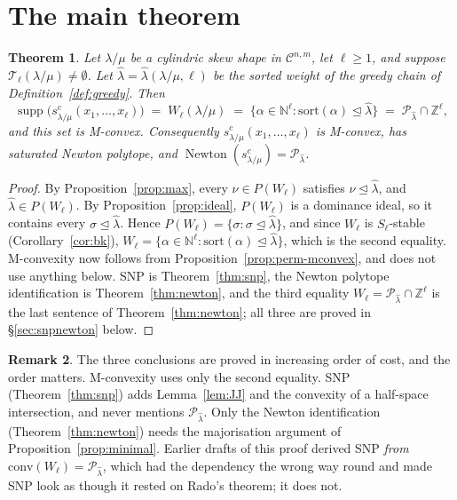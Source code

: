 \documentclass[11pt]{article}
\theoremstyle{plain}
\newtheorem{thm}{Theorem}[section]
\theoremstyle{definition}
\newtheorem{rem}[thm]{Remark}
\DeclareMathOperator{\supp}{supp}
\DeclareMathOperator{\Newton}{Newton}
\newcommand{\Z}{\mathbb{Z}}
\newcommand{\N}{\mathbb{N}}
\newcommand{\cyl}{\mathcal{C}}
\begin{document}
\section{The main theorem}

\begin{thm}\label{thm:main}
Let $\lambda/\mu$ be a cylindric skew shape in $\cyl^{n,m}$, let $\ell\ge 1$, and suppose
$\mathcal{T}_\ell(\lambda/\mu)\ne\emptyset$. Let $\hat\lambda=\hat\lambda(\lambda/\mu,\ell)$ be
the sorted weight of the greedy chain of Definition~\ref{def:greedy}. Then
\[
  \supp\bigl(s^{c}_{\lambda/\mu}(x_1,\dots,x_\ell)\bigr)\;=\;W_\ell(\lambda/\mu)
  \;=\;\{\alpha\in\N^{\ell}:\mathrm{sort}(\alpha)\trianglelefteq\hat\lambda\}
  \;=\;\mathcal{P}_{\hat\lambda}\cap\Z^{\ell},
\]
and this set is M-convex. Consequently $s^{c}_{\lambda/\mu}(x_1,\dots,x_\ell)$ is M-convex, has
saturated Newton polytope, and $\Newton(s^{c}_{\lambda/\mu})=\mathcal{P}_{\hat\lambda}$.
\end{thm}

\begin{proof}
By Proposition~\ref{prop:max}, every $\nu\in P(W_\ell)$ satisfies
$\nu\trianglelefteq\hat\lambda$, and $\hat\lambda\in P(W_\ell)$. By
Proposition~\ref{prop:ideal}, $P(W_\ell)$ is a dominance ideal, so it contains every
$\sigma\trianglelefteq\hat\lambda$. Hence $P(W_\ell)=\{\sigma:\sigma\trianglelefteq
\hat\lambda\}$, and since $W_\ell$ is $S_\ell$-stable (Corollary~\ref{cor:bk}),
$W_\ell=\{\alpha\in\N^\ell:\mathrm{sort}(\alpha)\trianglelefteq\hat\lambda\}$, which is the
second equality. M-convexity now follows from Proposition~\ref{prop:perm-mconvex}, and does not
use anything below. SNP is Theorem~\ref{thm:snp}, the Newton polytope identification is
Theorem~\ref{thm:newton}, and the third equality
$W_\ell=\mathcal{P}_{\hat\lambda}\cap\Z^{\ell}$ is the last sentence of
Theorem~\ref{thm:newton}; all three are proved in \S\ref{sec:snpnewton} below.
\end{proof}

\begin{rem}
The three conclusions are proved in increasing order of cost, and the order matters. M-convexity
uses only the second equality. SNP (Theorem~\ref{thm:snp}) adds Lemma~\ref{lem:JJ} and the
convexity of a half-space intersection, and never mentions $\mathcal{P}_{\hat\lambda}$. Only the
Newton identification (Theorem~\ref{thm:newton}) needs the majorisation argument of
Proposition~\ref{prop:minimal}. Earlier drafts of this proof derived SNP \emph{from}
$\mathrm{conv}(W_\ell)=\mathcal{P}_{\hat\lambda}$, which had the dependency the wrong way round
and made SNP look as though it rested on Rado's theorem; it does not.
\end{rem}
\end{document}
